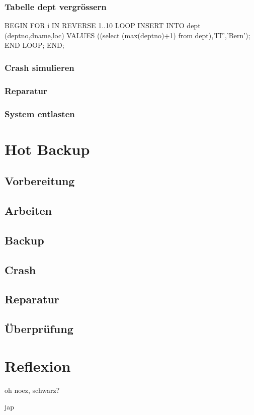 \documentclass[11pt,a4paper,parskip=half]{scrartcl}
\begin{document}
\subsubsection{Tabelle dept vergrössern}
BEGIN
  FOR i IN REVERSE 1..10 LOOP
   INSERT INTO dept (deptno,dname,loc)
   VALUES ((select (max(deptno)+1) from dept),'IT','Bern');
  END LOOP;
END;

\subsubsection{Crash simulieren}

\subsubsection{Reparatur}
\subsubsection{System entlasten}

\section{Hot Backup}
\subsection{Vorbereitung}
\subsection{Arbeiten}
\subsection{Backup}
\subsection{Crash}
\subsection{Reparatur}
\subsection{Überprüfung}

\section{Reflexion}
oh noez, schwarz?

jap
\end{document}
